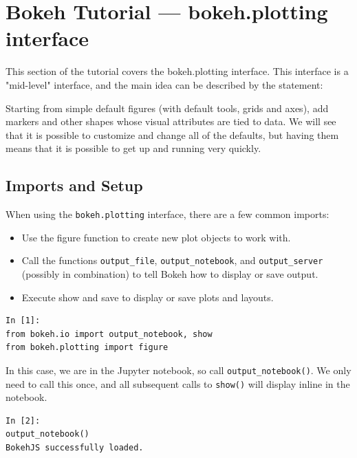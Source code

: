 \documentclass[a4paper,12pt]{article}
\begin{document}
\large
 	
\section{Bokeh Tutorial — bokeh.plotting interface}
This section of the tutorial covers the bokeh.plotting interface. This interface is a "mid-level" interface, and the main idea can be described by the statement:

Starting from simple default figures (with default tools, grids and axes), add markers and other shapes whose visual attributes are tied to data.
We will see that it is possible to customize and change all of the defaults, but having them means that it is possible to get up and running very quickly.

\subsection{Imports and Setup}
When using the \texttt{bokeh.plotting} interface, there are a few common imports:
\begin{itemize}


\item Use the figure function to create new plot objects to work with.
\item Call the functions \texttt{output\_file}, \texttt{output\_notebook}, and \texttt{output\_server} (possibly in combination) to tell Bokeh how to display or save output.
\item Execute show and save to display or save plots and layouts.
\end{itemize}


\begin{framed}
\begin{verbatim}
In [1]:
from bokeh.io import output_notebook, show
from bokeh.plotting import figure
\end{verbatim}
\end{framed}
In this case, we are in the Jupyter notebook, so call \texttt{output\_notebook()}. We only need to call this once, and all subsequent calls to \texttt{show()} will display inline in the notebook.
\begin{framed}
	\begin{verbatim}
In [2]:
output_notebook()
BokehJS successfully loaded.
\end{verbatim}
\end{framed}
\end{document}
